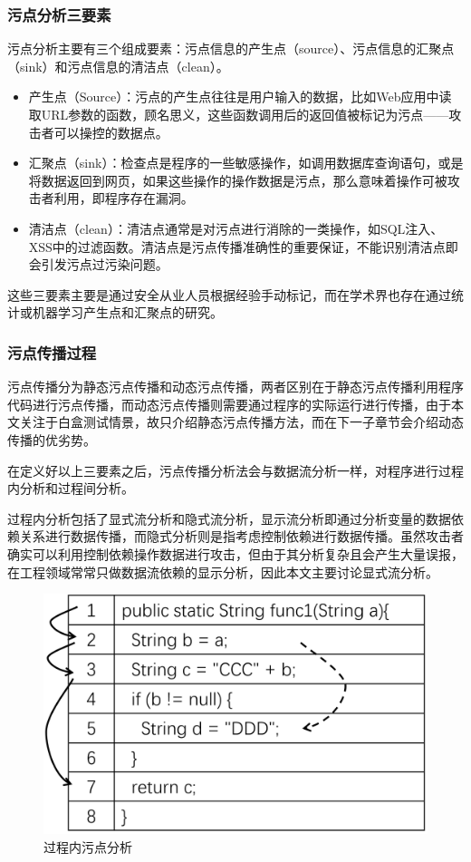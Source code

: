\subsubsection{污点分析三要素}
污点分析主要有三个组成要素：污点信息的产生点（source）、污点信息的汇聚点（sink）和污点信息的清洁点（clean）。

\begin{itemize}
	\item 产生点（Source）：污点的产生点往往是用户输入的数据，比如Web应用中读取URL参数的函数，顾名思义，这些函数调用后的返回值被标记为污点——攻击者可以操控的数据点。
	\item 汇聚点（sink）：检查点是程序的一些敏感操作，如调用数据库查询语句，或是将数据返回到网页，如果这些操作的操作数据是污点，那么意味着操作可被攻击者利用，即程序存在漏洞。
	\item 清洁点（clean）：清洁点通常是对污点进行消除的一类操作，如SQL注入、XSS中的过滤函数。清洁点是污点传播准确性的重要保证，不能识别清洁点即会引发污点过污染问题。
\end{itemize}
这些三要素主要是通过安全从业人员根据经验手动标记，而在学术界也存在通过统计或机器学习产生点和汇聚点的研究。\\

\subsubsection{污点传播过程}
污点传播分为静态污点传播和动态污点传播，两者区别在于静态污点传播利用程序代码进行污点传播，而动态污点传播则需要通过程序的实际运行进行传播，由于本文关注于白盒测试情景，故只介绍静态污点传播方法，而在下一子章节会介绍动态传播的优劣势。

在定义好以上三要素之后，污点传播分析法会与数据流分析一样，对程序进行过程内分析和过程间分析。

过程内分析包括了显式流分析和隐式流分析，显示流分析即通过分析变量的数据依赖关系进行数据传播，而隐式分析则是指考虑控制依赖进行数据传播。虽然攻击者确实可以利用控制依赖操作数据进行攻击，但由于其分析复杂且会产生大量误报，在工程领域常常只做数据流依赖的显示分析，因此本文主要讨论显式流分析。

\begin{figure}[htb]
	\centering
	\includegraphics[width=0.5\linewidth]{FIGs/chapter2/internal_taintflow.png}
	\caption{过程内污点分析}\label{internalflow}
\end{figure}

